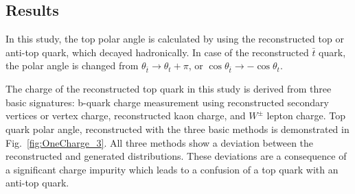 \subsection{Results}

In this study, the top polar angle is calculated by using the reconstructed top or anti-top quark, which decayed hadronically.
In case of the reconstructed $\bar{t}$ quark, the polar angle is changed from $\theta_{\bar{t}} \to \theta_{t} + \pi$, or $\cos\theta_{\bar{t}} \to -\cos\theta_{t}$. 

The charge of the reconstructed top quark in this study is derived from three basic signatures: b-quark charge measurement using reconstructed secondary vertices or vertex charge, reconstructed kaon charge, and $W^\pm$ lepton charge. 
Top quark polar angle, reconstructed with the three basic methods is demonstrated in Fig.~\ref{fig:OneCharge_3}.
All three methods show a deviation between the reconstructed and generated distributions.
These deviations are a consequence of a significant charge impurity which leads to a confusion of a top quark with an anti-top quark.


